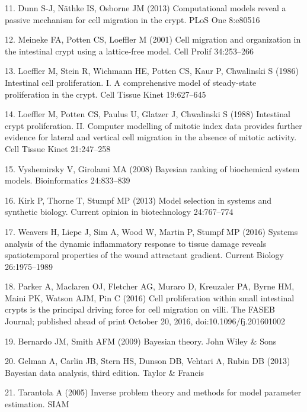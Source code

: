 \documentclass[10pt,letterpaper]{article}
\begin{document}
\hypertarget{ref-Dunn2013-tg}{}
11. Dunn S-J, Näthke IS, Osborne JM (2013) Computational models reveal a
passive mechanism for cell migration in the crypt. PLoS One 8:e80516

\hypertarget{ref-Meineke2001-xi}{}
12. Meineke FA, Potten CS, Loeffler M (2001) Cell migration and
organization in the intestinal crypt using a lattice-free model. Cell
Prolif 34:253--266

\hypertarget{ref-Loeffler1986-ej}{}
13. Loeffler M, Stein R, Wichmann HE, Potten CS, Kaur P, Chwalinski S
(1986) Intestinal cell proliferation. I. A comprehensive model of
steady-state proliferation in the crypt. Cell Tissue Kinet 19:627--645

\hypertarget{ref-Loeffler1988-zb}{}
14. Loeffler M, Potten CS, Paulus U, Glatzer J, Chwalinski S (1988)
Intestinal crypt proliferation. II. Computer modelling of mitotic index
data provides further evidence for lateral and vertical cell migration
in the absence of mitotic activity. Cell Tissue Kinet 21:247--258

\hypertarget{ref-Vyshemirsky2008-gh}{}
15. Vyshemirsky V, Girolami MA (2008) Bayesian ranking of biochemical
system models. Bioinformatics 24:833--839

\hypertarget{ref-Kirk2013-cd}{}
16. Kirk P, Thorne T, Stumpf MP (2013) Model selection in systems and
synthetic biology. Current opinion in biotechnology 24:767--774

\hypertarget{ref-Weavers2016-ab}{}
17. Weavers H, Liepe J, Sim A, Wood W, Martin P, Stumpf MP (2016)
Systems analysis of the dynamic inflammatory response to tissue damage
reveals spatiotemporal properties of the wound attractant gradient.
Current Biology 26:1975--1989

\hypertarget{ref-Parker2016-jf}{}
18. Parker A, Maclaren OJ, Fletcher AG, Muraro D, Kreuzaler PA, Byrne
HM, Maini PK, Watson AJM, Pin C (2016) Cell proliferation within small
intestinal crypts is the principal driving force for cell migration on
villi. The FASEB Journal; published ahead of print October 20, 2016,
doi:10.1096/fj.201601002

\hypertarget{ref-Bernardo2009-uw}{}
19. Bernardo JM, Smith AFM (2009) Bayesian theory. John Wiley \& Sons

\hypertarget{ref-Gelman2013-id}{}
20. Gelman A, Carlin JB, Stern HS, Dunson DB, Vehtari A, Rubin DB (2013)
Bayesian data analysis, third edition. Taylor \& Francis

\hypertarget{ref-Tarantola2005-sv}{}
21. Tarantola A (2005) Inverse problem theory and methods for model
parameter estimation. SIAM
\end{document}

